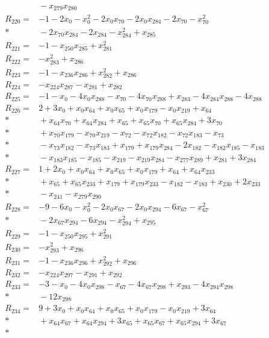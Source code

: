 \begin{align*}
&{}-x_{279}x_{280}\\[3pt]
R_{220}={}&-1-2x_{0}-x_{0}^{2}-2x_{0}x_{70}-2x_{0}x_{284}-2x_{70}-x_{70}^{2}\\*
&{}-2x_{70}x_{284}-2x_{284}-x_{284}^{2}+x_{285}\\[3pt]
R_{221}={}&-1-x_{250}x_{285}+x_{281}^{2}\\[3pt]
R_{222}={}&-x_{283}^{2}+x_{286}\\[3pt]
R_{223}={}&-1-x_{236}x_{286}+x_{282}^{2}+x_{286}\\[3pt]
R_{224}={}&-x_{224}x_{287}-x_{281}+x_{282}\\[3pt]
R_{225}={}&-1-x_{0}-4x_{0}x_{288}-x_{70}-4x_{70}x_{288}+x_{283}-4x_{284}x_{288}-4x_{288}\\[3pt]
R_{226}={}&2+3x_{0}+x_{0}x_{64}+x_{0}x_{65}+x_{0}x_{179}-x_{0}x_{219}+x_{64}\\*
&{}+x_{64}x_{70}+x_{64}x_{284}+x_{65}+x_{65}x_{70}+x_{65}x_{284}+3x_{70}\\*
&{}+x_{70}x_{179}-x_{70}x_{219}-x_{72}-x_{72}x_{182}-x_{72}x_{183}-x_{73}\\*
&{}-x_{73}x_{182}-x_{73}x_{183}+x_{179}+x_{179}x_{284}-2x_{182}-x_{182}x_{185}-x_{183}\\*
&{}-x_{183}x_{185}-x_{185}-x_{219}-x_{219}x_{284}-x_{277}x_{289}+x_{281}+3x_{284}\\[3pt]
R_{227}={}&1+2x_{0}+x_{0}x_{64}+x_{0}x_{65}+x_{0}x_{179}+x_{64}+x_{64}x_{233}\\*
&{}+x_{65}+x_{65}x_{233}+x_{179}+x_{179}x_{233}-x_{182}-x_{183}+x_{230}+2x_{233}\\*
&{}-x_{241}-x_{279}x_{290}\\[3pt]
R_{228}={}&-9-6x_{0}-x_{0}^{2}-2x_{0}x_{67}-2x_{0}x_{294}-6x_{67}-x_{67}^{2}\\*
&{}-2x_{67}x_{294}-6x_{294}-x_{294}^{2}+x_{295}\\[3pt]
R_{229}={}&-1-x_{250}x_{295}+x_{291}^{2}\\[3pt]
R_{230}={}&-x_{293}^{2}+x_{296}\\[3pt]
R_{231}={}&-1-x_{236}x_{296}+x_{292}^{2}+x_{296}\\[3pt]
R_{232}={}&-x_{224}x_{297}-x_{291}+x_{292}\\[3pt]
R_{233}={}&-3-x_{0}-4x_{0}x_{298}-x_{67}-4x_{67}x_{298}+x_{293}-4x_{294}x_{298}\\*
&{}-12x_{298}\\[3pt]
R_{234}={}&9+3x_{0}+x_{0}x_{64}+x_{0}x_{65}+x_{0}x_{179}-x_{0}x_{219}+3x_{64}\\*
&{}+x_{64}x_{67}+x_{64}x_{294}+3x_{65}+x_{65}x_{67}+x_{65}x_{294}+3x_{67}\\*

\end{align*}
